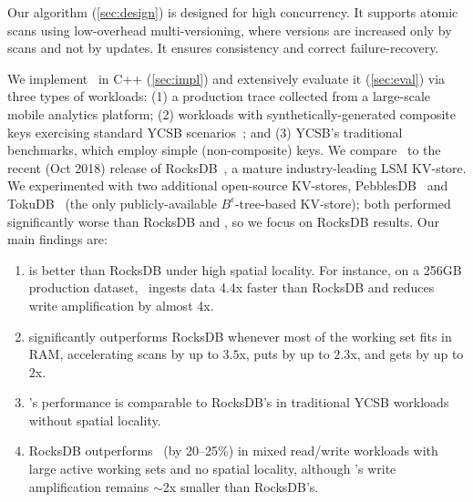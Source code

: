 
Our algorithm (\cref{sec:design}) is designed for high concurrency. 
It supports atomic scans using low-overhead multi-versioning, where versions are increased only by scans and not by updates. 
It ensures consistency and correct failure-recovery. 

We implement \sys\ in  C++ (\cref{sec:impl}) and extensively evaluate it (\cref{sec:eval})
via three types of workloads: (1) a production trace collected from a large-scale mobile analytics platform; 
(2)  workloads with synthetically-generated composite keys exercising  standard YCSB scenarios~\cite{YCSB};
and (3)  YCSB's traditional benchmarks, which employ simple (non-composite) keys.  
We compare \sys\ to the recent (Oct 2018) release of RocksDB~\cite{RocksDB}, a mature industry-leading LSM KV-store. 
We  experimented with two additional open-source KV-stores, PebblesDB~\cite{PebblesDB}  and  
TokuDB~\cite{TokuDB} (the only publicly-available $B^{\epsilon}$-tree-based 
KV-store); both performed significantly worse than  RocksDB and \sys, so we focus on RocksDB results. 
Our main findings are: 
\begin{enumerate} 
\item \sys\/ is  better than RocksDB under high spatial  locality.  
For instance, on a 256GB production dataset, \sys\ ingests data 4.4x faster than RocksDB %
and reduces write amplification by almost 4x. 
\item \sys\/ significantly outperforms RocksDB whenever most of the working set fits in RAM, 
accelerating scans by up to $3.5$x, puts by up to $2.3$x, and gets by up to $2$x. 
\item \sys's performance is  comparable to RocksDB's in traditional YCSB workloads without spatial locality.
\item RocksDB outperforms \sys\ (by 20--25\%)  in mixed read/write workloads with large active working sets and no spatial locality, 
although \sys's write amplification remains $\sim$2x smaller than RocksDB's. 
\end{enumerate}

